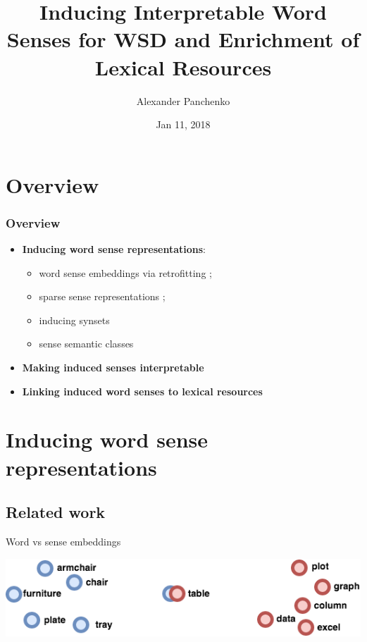 \documentclass[usenames,dvipsnames]{beamer}
\title{Inducing Interpretable Word Senses for WSD and Enrichment of Lexical Resources}
\author{Alexander Panchenko}
\date[11.02.2018]{Jan 11, 2018}
\begin{document}
\maketitle


\section{Overview}

\begin{frame}
  \frametitle{Overview}

  \begin{itemize}
		\item \textbf{Inducing word sense representations}:
		\begin{itemize}
		\item word sense embeddings via retrofitting \cite{pelevina-EtAl:2016:RepL4NLP,remus:2018};
		\item sparse sense representations \cite{panchenko-EtAl:2017:EACLlong};
		\item inducing synsets~\cite{ustalov-panchenko-biemann:2017:Long}
		\item sense semantic classes \cite{panchenko:2018:SemanticClasses} 
		\end{itemize}
		
	\pause 
	\vspace{1em}
	\item \textbf{Making induced senses interpretable} \cite{panchenko-EtAl:2017:EMNLP2017Demos,panchenko-EtAl:2017:EACLlong}
	
	\pause
	\vspace{1em}
	\item \textbf{Linking induced word senses to lexical resources}~\cite{faralli2016linked,panchenko-EtAl:2017:SENSE2017,biemann2018framework}	
			
\end{itemize}
	
\end{frame}

\section{Inducing word sense representations}


\subsection{Related work}

\begin{frame}{Word vs sense embeddings}

\begin{center}
	\includegraphics[width=1.0\textwidth]{table-ambigous}
\end{center}	
\end{frame}
\end{document}
